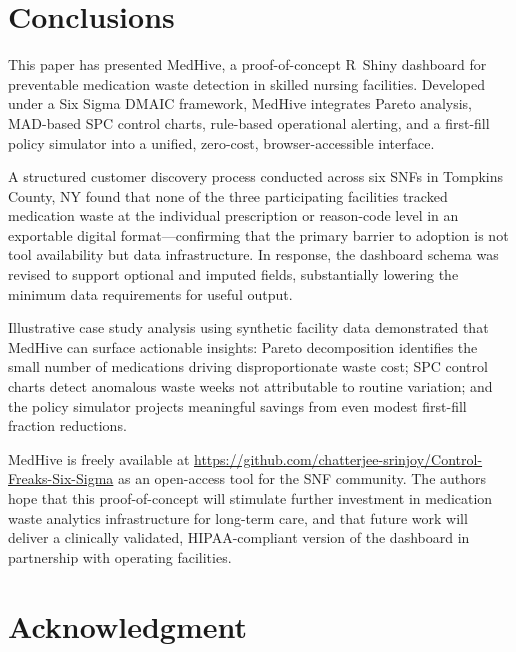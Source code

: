 \documentclass[letterpaper, 10pt, conference]{IEEEconf}
\begin{document}
\section{Conclusions}

This paper has presented MedHive, a proof-of-concept R~Shiny dashboard for
preventable medication waste detection in skilled nursing facilities.
Developed under a Six Sigma DMAIC framework, MedHive integrates Pareto
analysis, MAD-based SPC control charts, rule-based operational alerting, and a
first-fill policy simulator into a unified, zero-cost, browser-accessible
interface.

A structured customer discovery process conducted across six SNFs in Tompkins
County, NY found that none of the three participating facilities tracked
medication waste at the individual prescription or reason-code level in an
exportable digital format---confirming that the primary barrier to adoption
is not tool availability but data infrastructure.
In response, the dashboard schema was revised to support optional and imputed
fields, substantially lowering the minimum data requirements for useful output.

Illustrative case study analysis using synthetic facility data demonstrated
that MedHive can surface actionable insights: Pareto decomposition identifies
the small number of medications driving disproportionate waste cost;
SPC control charts detect anomalous waste weeks not attributable to routine
variation; and the policy simulator projects meaningful savings from even
modest first-fill fraction reductions.

MedHive is freely available at
\url{https://github.com/chatterjee-srinjoy/Control-Freaks-Six-Sigma}
as an open-access tool for the SNF community.
The authors hope that this proof-of-concept will stimulate further investment
in medication waste analytics infrastructure for long-term care, and that
future work will deliver a clinically validated, HIPAA-compliant version of
the dashboard in partnership with operating facilities.


\section*{Acknowledgment}
\end{document}
